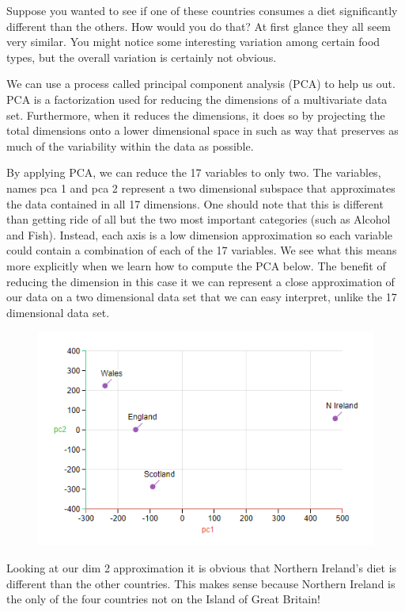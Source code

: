 \documentclass{article}
\begin{document}
Suppose you wanted to see if one of these countries consumes a diet significantly different than the others. How would you do that? At first glance they all seem very similar. You might notice some interesting variation among certain food types, but the overall variation is certainly not obvious. 
\bigskip

We can use a process called principal component analysis (PCA) to help us out. PCA is a factorization used for reducing the dimensions of a multivariate data set. Furthermore, when it reduces the dimensions, it does so by projecting the total dimensions onto a lower dimensional space in such as way that preserves as much of the variability within the data as possible.

\bigskip
By applying PCA, we can reduce the 17 variables to only two. The variables, names pca 1 and pca 2 represent a two dimensional subspace that approximates the data contained in all 17 dimensions. One should note that this is different than getting ride of all but the two most important categories (such as Alcohol and Fish). Instead, each axis is a low dimension approximation so each variable could contain a combination of each of the 17 variables. We see what this means more explicitly when we learn how to compute the PCA below. The benefit of reducing the dimension in this case it we can represent a close approximation of our data on a two dimensional data set that we can easy interpret, unlike the 17 dimensional data set.
\newpage
\begin{figure}[!htp]
    \centering
    \includegraphics[width=12cm]{(18).png}
\end{figure}

Looking at our dim 2 approximation it is obvious that Northern Ireland's diet is different than the other countries. This makes sense because Northern Ireland is the only of the four countries not on the Island of Great Britain!
\end{document}
